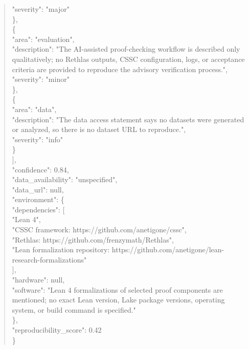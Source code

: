 \documentclass[11pt]{article}
\begin{document}
\begin{quote}
      "severity": "major"\\
    \},\\
    \{\\
      "area": "evaluation",\\
      "description": "The AI-assisted proof-checking workflow is described only qualitatively; no Rethlas outputs, CSSC configuration, logs, or acceptance criteria are provided to reproduce the advisory verification process.",\\
      "severity": "minor"\\
    \},\\
    \{\\
      "area": "data",\\
      "description": "The data access statement says no datasets were generated or analyzed, so there is no dataset URL to reproduce.",\\
      "severity": "info"\\
    \}\\
  ],\\
  "confidence": 0.84,\\
  "data\_availability": "unspecified",\\
  "data\_url": null,\\
  "environment": \{\\
    "dependencies": [\\
      "Lean 4",\\
      "CSSC framework: https://github.com/anetigone/cssc",\\
      "Rethlas: https://github.com/frenzymath/Rethlas",\\
      "Lean formalization repository: https://github.com/anetigone/lean-research-formalizations"\\
    ],\\
    "hardware": null,\\
    "software": "Lean 4 formalizations of selected proof components are mentioned; no exact Lean version, Lake package versions, operating system, or build command is specified."\\
  \},\\
  "reproducibility\_score": 0.42\\
\}\\
\end{quote}
\end{document}
